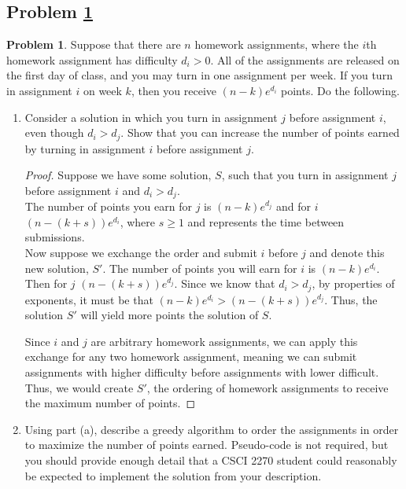 \documentclass[11pt]{article}
\theoremstyle{definition}
\theoremstyle{definition}
\newtheorem{required}{Problem}
\theoremstyle{definition}
\begin{document}
\subsection{Problem \ref{DFS1}}
\begin{required} \label{DFS1}
Suppose that there are $n$ homework assignments, where the $i$th homework assignment has difficulty $d_{i}>0$. All of the assignments are released on the first day of class, and you may turn in one assignment per week. If you turn in assignment $i$ on week $k$, then you receive $(n-k) e^{d_i}$ points. Do the following.

\begin{enumerate}[label=(\alph*)]
\item Consider a solution in which you turn in assignment $j$ before assignment $i$, even though $d_{i} > d_{j}$. Show that you can increase the number of points earned by turning in assignment $i$ before assignment $j$.

\begin{proof}
Suppose we have some solution, $S$, such that you turn in assignment $j$ before assignment $i$ and $d_{i} > d_{j}$. \\
The number of points you earn for $j$ is $(n-k) e^{d_j}$ and for $i$ $(n-(k+s)) e^{d_i}$, where $s \geq 1$ and represents the time between submissions.\\

Now suppose we exchange the order and submit $i$ before $j$ and denote this new solution, $S'$. The number of points you will earn for $i$ is $(n-k) e^{d_i}$. Then for $j$ $(n-(k+s)) e^{d_j}$. Since we know that $d_{i} > d_{j}$, by properties of exponents, it must be that $(n-k) e^{d_i} > (n-(k+s)) e^{d_j}$. Thus, the solution $S'$ will yield more points the solution of $S$. 

Since $i$ and $j$ are arbitrary homework assignments, we can apply this exchange for any two homework assignment, meaning we can submit assignments with higher difficulty before assignments with lower difficult. Thus, we would create $S'$, the ordering of homework assignments to receive the maximum number of points.
\end{proof}


\vskip 50pt
\item Using part (a), describe a greedy algorithm to order the assignments in order to maximize the number of points earned. Pseudo-code is not required, but you should provide enough detail that a CSCI 2270 student could reasonably be expected to implement the solution from your description.


\end{enumerate}
\end{required}
\end{document}
